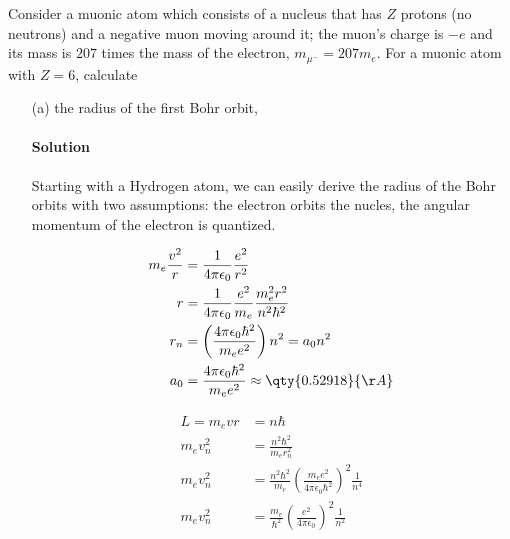 \documentclass{article}
\numberwithin{equation}{section}
\begin{document}
	Consider a muonic atom which consists of a nucleus that has $Z$ protons (no neutrons) and a negative muon moving around it; the muon's charge is $-e$ and its mass is $207$ times the mass of the electron, $m_{\mu^-} = 207m_e$. For a muonic atom with $Z=6$, calculate
	\begin{enumerate}
		\item[(a)] the radius of the first Bohr orbit,
		\paragraph{Solution} Starting with a Hydrogen atom, we can easily derive the radius of the Bohr orbits with two assumptions: the electron orbits the nucles, the angular momentum of the electron is quantized.
        
        \begin{minipage}{0.45\textwidth}
            \begin{align}
                m_e \frac{v^2}{r} &= \frac{1}{4\pi\epsilon_0} \frac{e^2}{r^2} \\
                                r &= \frac{1}{4\pi\epsilon_0} \frac{e^2}{m_e} \frac{m_e^2 r^2}{n^2 \hbar^2} \\
                              r_n &= \left( \frac{4\pi\epsilon_0 \hbar^2}{m_e e^2} \right) n^2 = a_0 n^2 \\
                              a_0 &= \frac{4\pi\epsilon_0 \hbar^2}{m_e e^2} \approx \qty{0.52918}{\AA}
            \end{align}
        \end{minipage}
        \begin{minipage}{0.45\textwidth}
            \begin{align}
                L = m_e vr &= n\hbar \\
                 m_e v_n^2 &= \frac{n^2 \hbar^2}{m_e r_n^2} \\
                 m_e v_n^2 &= \frac{n^2 \hbar^2}{m_e} \left(  \frac{m_e e^2}{4\pi\epsilon_0 \hbar^2} \right)^2 \frac{1}{n^4} \\
                 m_e v_n^2 &= \frac{m_e}{\hbar^2} \left(  \frac{e^2}{4\pi\epsilon_0} \right)^2 \frac{1}{n^2}
            \end{align}
        \end{minipage}
        

\end{enumerate}
\end{document}
